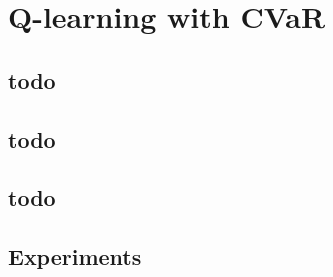 \chapter{Q-learning with CVaR}\label{ch:qlearning}



\section{todo}


\section{todo}


\section{todo}


\section{Experiments}

